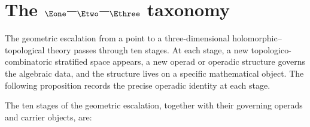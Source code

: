 \section{The $\Eone$--$\Etwo$--$\Ethree$ taxonomy}
\label{sec:en-taxonomy}

The geometric escalation from a point to a three-dimensional
holomorphic--topological theory passes through ten stages. At each
stage, a new topologico-combinatoric stratified space appears, a
new operad or operadic structure governs the algebraic data, and
the structure lives on a specific mathematical object. The
following proposition records the precise operadic identity at
each stage.

\begin{proposition}
\label{prop:en-taxonomy}
The ten stages of the geometric escalation, together with their
governing operads and carrier objects, are:


\end{proposition}
